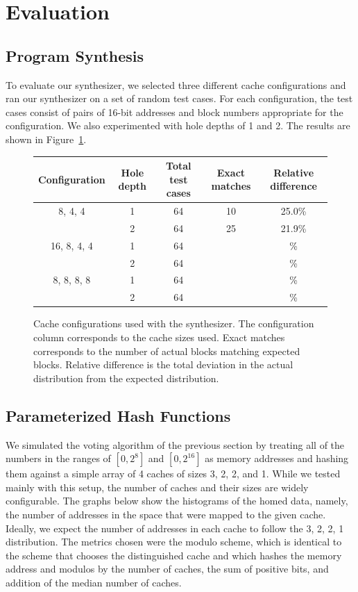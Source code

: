 \section{Evaluation}
\label{sec:Eval}

\subsection{Program Synthesis}

To evaluate our synthesizer, we selected three different cache configurations
and ran our synthesizer on a set of random test cases. For each configuration,
the test cases consist of pairs of 16-bit addresses and block numbers
appropriate for the configuration. We also experimented with hole depths of 1
and 2. The results are shown in Figure~\ref{Fig:synth_results}.

\begin{figure}[h]
  \centering
  \begin{tabular}{|c|c|c|c|c|}
    \hline
    Configuration & Hole depth & Total test cases & Exact matches & Relative difference
    \\ \hline
    8, 4, 4     & 1 & 64 & 10 & 25.0\% \\ \hline
                & 2 & 64 & 25 & 21.9\% \\ \hline
    16, 8, 4, 4 & 1 & 64 &    & \% \\ \hline
                & 2 & 64 &    & \% \\ \hline
    8, 8, 8, 8  & 1 & 64 &    & \% \\ \hline
                & 2 & 64 &    & \% \\ \hline
  \end{tabular}
  \caption{Cache configurations used with the synthesizer. The configuration
    column corresponds to the cache sizes used. Exact matches corresponds to the
    number of actual blocks matching expected blocks. Relative difference is the
    total deviation in the actual distribution from the expected distribution.}
  \label{Fig:synth_results}
\end{figure}

\subsection{Parameterized Hash Functions}

We simulated the voting algorithm of the previous section by treating all of the
numbers in the ranges of $[0, 2^{8}]$ and $[0, 2^{16}]$ as memory addresses and
hashing them against a simple array of 4 caches of sizes 3, 2, 2, and 1.  While
we tested mainly with this setup, the number of caches and their sizes are
widely configurable.  The graphs below show the histograms of the homed data,
namely, the number of addresses in the space that were mapped to the given
cache.  Ideally, we expect the number of addresses in each cache to follow the
3, 2, 2, 1 distribution.  The metrics chosen were the modulo scheme, which is
identical to the scheme that chooses the distinguished cache and which hashes
the memory address and modulos by the number of caches, the sum of positive
bits, and addition of the median number of caches.


